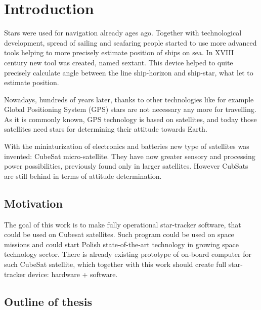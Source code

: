 \documentclass[12pt,a4paper,oneside]{article}
\begin{document}
\glsaddall
\setlength{\glsdescwidth}{0.5\linewidth}
\setlength{\glspagelistwidth}{0.1\linewidth}

\printnoidxglossary[type=acronym,sort=letter]
\newpage

\printnoidxglossary[type=symbols,sort=use]

\newpage


\section{Introduction}
Stars were used for navigation already ages ago. Together with technological development, spread of sailing and seafaring people started to use more advanced tools helping to more precisely estimate position of ships on sea. In XVIII century new tool was created, named sextant. This device helped to quite precisely calculate angle between the line ship-horizon and ship-star, what let to estimate position.

Nowadays, hundreds of years later, thanks to other technologies like for example Global Positioning System (GPS) stars are not necessary any more for travelling. As it is commonly known, GPS technology is based on satellites, and today those satellites need stars for determining their attitude towards Earth.

With the miniaturization of electronics and batteries new type of satellites was invented: CubeSat micro-satellite. They have now greater sensory and processing power possibilities, previously found only in larger satellites. However CubSats are still behind in terms of attitude determination.

\subsection{Motivation}
The goal of this work is to make fully operational star-tracker software, that could be used on Cubesat satellites. Such program could be used on space missions and could start Polish state-of-the-art technology in growing space technology sector.
There is already existing prototype of on-board computer for such CubeSat satellite, which together with this work should create full star-tracker device: hardware + software.

\subsection{Outline of thesis}
\end{document}
